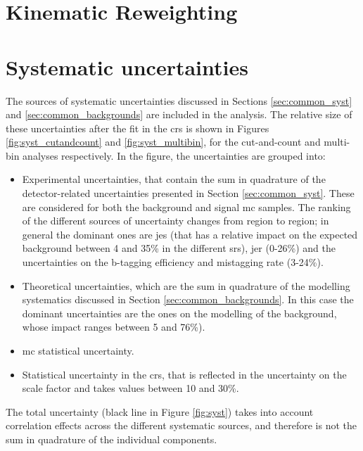 \section{Kinematic Reweighting}

\section{Systematic uncertainties}
\label{sec:strong:syst}

The sources of systematic uncertainties discussed in Sections \ref{sec:common_syst} and \ref{sec:common_backgrounds} are included in the analysis.
The relative size of these uncertainties after the fit in the \glspl{cr} is shown in Figures \ref{fig:syst_cutandcount} and \ref{fig:syst_multibin},
for the cut-and-count and multi-bin analyses respectively. 
In the figure, the uncertainties are grouped into:
\begin{itemize}
\item Experimental uncertainties, that contain the sum in quadrature of the detector-related uncertainties 
presented in Section \ref{sec:common_syst}. These are considered for both the background and signal \gls{mc} samples.
The ranking of the different sources of uncertainty changes from region to region; in general the dominant ones are \gls{jes} (that has a 
relative impact on the expected background between 4 and 35\% in the different \glspl{sr}), \gls{jer} (0-26\%) and the uncertainties on the 
b-tagging efficiency and mistagging rate (3-24\%).

\item Theoretical uncertainties, which are the sum in quadrature of the modelling systematics discussed in Section \ref{sec:common_backgrounds}.
In this case the dominant uncertainties are the ones on the modelling of the \ttbar background, whose impact ranges between 5 and 76\%).

\item \gls{mc} statistical uncertainty.

\item Statistical uncertainty in the \glspl{cr}, that is reflected in the uncertainty on the \ttbar scale factor and takes values between 10 and 30\%.

\end{itemize}

The total uncertainty (black line in Figure \ref{fig:syst}) takes into account correlation effects across the different systematic sources, 
and therefore is not the sum in quadrature of the individual components. 

